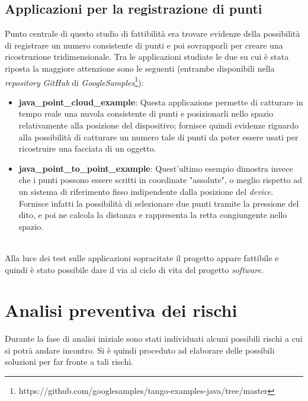\subsection{Applicazioni per la registrazione di punti}
Punto centrale di questo studio di fattibilità era trovare evidenze della possibilità di registrare un numero consistente di punti e poi sovrapporli per creare una ricostruzione tridimensionale.
Tra le applicazioni studiate le due su cui è stata riposta la maggiore attenzione sono le seguenti (entrambe disponibili nella \emph{repository} \emph{GitHub} di \emph{GoogleSamples}\footnote{https://github.com/googlesamples/tango-examples-java/tree/master}):
\begin{itemize}
	\item \textbf{java\_point\_cloud\_example}: Questa applicazione permette di catturare in tempo reale una nuvola consistente di punti e posizionarli nello spazio relativamente alla posizione del dispositivo; fornisce quindi evidenze riguardo alla possibilità di catturare un numero tale di punti da poter essere usati per ricostruire una facciata di un oggetto.
	\item \textbf{java\_point\_to\_point\_example}: Quest'ultimo esempio dimostra invece che i punti possono essere scritti in coordinate "assolute", o meglio rispetto ad un sistema di riferimento fisso indipendente dalla posizione del \emph{device}. Fornisce infatti la possibilità di selezionare due punti tramite la pressione del dito, e poi ne calcola la distanza e rappresenta la retta congiungente nello spazio.
\end{itemize}
\ \\
Alla luce dei test sulle applicazioni sopracitate il progetto appare fattibile e quindi è stato possibile dare il via al ciclo di vita del progetto \emph{software}.


\section{Analisi preventiva dei rischi}

Durante la fase di analisi iniziale sono stati individuati alcuni possibili rischi a cui si potrà andare incontro.
Si è quindi proceduto ad elaborare delle possibili soluzioni per far fronte a tali rischi.\\

